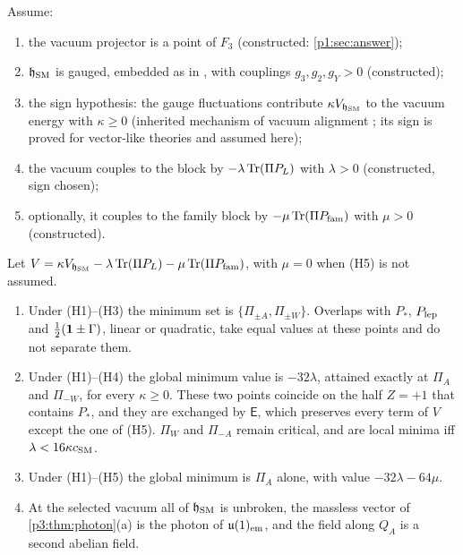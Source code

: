 \begin{theorem}[Selection on $F_3$]
\label{p3:thm:selection}
Assume:
\begin{enumerate}[label=(H\arabic*),leftmargin=2.6em]
\item the vacuum projector is a point of $F_3$ (constructed: \cref{p1:sec:answer});
\item $\mathfrak h_{\rm SM}$ is gauged, embedded as in \cite[Section~8]{ES17}, with couplings $g_3,g_2,g_Y>0$ (constructed);
\item the sign hypothesis: the gauge fluctuations contribute $\kappa V_{\mathfrak h_{\rm SM}}$ to the vacuum energy with $\kappa\ge0$ (inherited mechanism of vacuum alignment
\cite{Peskin80,Preskill81}; its sign is proved for vector-like theories \cite{Witten83} and assumed here);
\item the vacuum couples to the block by $-\lambda\operatorname{Tr}(\Pi P_L)$ with $\lambda>0$ (constructed, sign chosen);
\item optionally, it couples to the family block by $-\mu\operatorname{Tr}(\Pi P_{\rm fam})$ with $\mu>0$ (constructed).
\end{enumerate}
Let $V=\kappa V_{\mathfrak h_{\rm SM}}-\lambda\operatorname{Tr}(\Pi P_L)-\mu\operatorname{Tr}(\Pi P_{\rm fam})$, with $\mu=0$ when (H5) is not assumed.
\begin{enumerate}[label=(\alph*),leftmargin=2.2em]
\item Under (H1)--(H3) the minimum set is $\{\Pi_{\pm A},\Pi_{\pm W}\}$. Overlaps with $P_*$, $P_{\rm lep}$ and $\tfrac12(\mathbf 1\pm\Gamma)$, linear or quadratic, take equal values at
these points and do not separate them.
\item Under (H1)--(H4) the global minimum value is $-32\lambda$, attained exactly at $\Pi_A$ and $\Pi_{-W}$, for every $\kappa\ge0$. These two points coincide on the half
$Z=+1$ that contains $P_*$, and they are exchanged by $\mathsf E$, which preserves every term of $V$ except the one of (H5). $\Pi_W$ and $\Pi_{-A}$ remain critical, and are
local minima iff $\lambda<16\kappa c_{\rm SM}$.
\item Under (H1)--(H5) the global minimum is $\Pi_A$ alone, with value $-32\lambda-64\mu$.
\item At the selected vacuum all of $\mathfrak h_{\rm SM}$ is unbroken, the massless vector of \cref{p3:thm:photon}(a) is the photon of $\mathfrak{u}(1)_{\rm em}$, and the field along $Q_A$ is
a second abelian field.
\end{enumerate}
\end{theorem}

